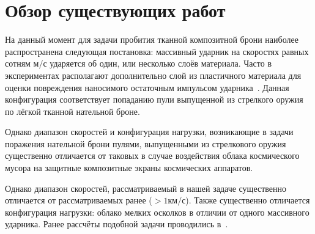 \chapter{Обзор существующих работ}\label{ch:overview}

На данный момент для задачи пробития тканной композитной брони наиболее распространена следующая постановка:
массивный ударник на скоростях равных сотням $м/с$ ударяется об один, или несколько слоёв материала.
Часто в экспериментах располагают дополнительно слой из пластичного материала для оценки повреждения наносимого
остаточным импульсом ударника~\cite{kobylkin2014}.
Данная конфигурация соответствует попаданию пули выпущенной из стрелкого оружия по лёгкой тканной нательной броне.

Однако диапазон скоростей и конфигурация нагрузки, возникающие в задачи поражения нательной брони пулями, выпущенными
из стрелкового оружия существенно отличается от таковых в случае воздействия облака космического мусора на защитные
композитные экраны космических аппаратов.

Однако диапазон скоростей, рассматриваемый в нашей задаче существенно отличается от рассматриваемых ранее ($> 1 км/с$).
Также существенно отличается конфигурация нагрузки: облако мелких осколков в отличии от одного массивного ударника.
Ранее рассчёты подобной задачи проводились в~\cite{farenthold}.
